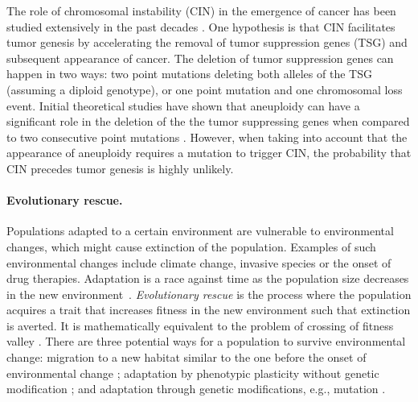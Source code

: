 \documentclass[12pt]{extarticle}
\begin{document}

The role of chromosomal instability (CIN) in the emergence of cancer has been studied extensively in the past decades \citep{michor2005can,christine2018understanding,nowak2002role,pavelka2010dr,komarova2003mutation,zhu2018cellular}.
One hypothesis is that CIN facilitates tumor genesis by accelerating the removal of tumor suppression genes (TSG) and subsequent appearance of cancer. The deletion of tumor suppression genes can happen in two ways: two point mutations deleting both alleles of the TSG (assuming a diploid genotype), or one point mutation and one chromosomal loss event.
Initial theoretical studies have shown that aneuploidy can have a significant role in the deletion of the the tumor suppressing genes when compared to two consecutive point mutations \citep{nowak2002role,komarova2003mutation,michor2005can,komarova2008selective}.
However, when taking into account that the appearance of aneuploidy requires a mutation to trigger CIN, the probability that CIN precedes tumor genesis is highly unlikely.

\paragraph{Evolutionary rescue.} Populations adapted to a certain environment are vulnerable to environmental changes, which might cause extinction of the population. Examples of such environmental changes include climate change, invasive species or the onset of drug therapies. Adaptation is a race against time as the population size decreases in the new environment~\citep{tanaka2022surviving}. 
\emph{Evolutionary rescue} is the process where the population acquires a trait that increases fitness in the new environment such that extinction is averted. It is mathematically equivalent to the problem of crossing of fitness valley \citep{weissman2009rate,weissman2010rate}.
There are three potential ways for a population to survive environmental change: migration to a new habitat similar to the one before the onset of environmental change \citep{cobbold2020should}; adaptation by phenotypic plasticity without genetic modification \citep{carja2019evolutionary,carja2017evolutionary,levien2021non}; and adaptation through genetic modifications, e.g., mutation \citep{uecker2014evolutionary,uecker2016role,uecker2011fixation}.
\end{document}
